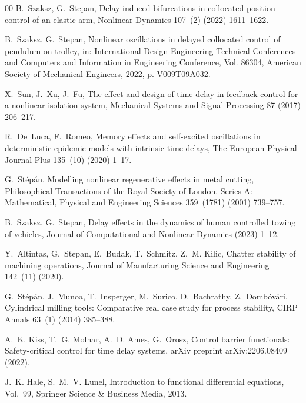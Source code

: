 \documentclass[preprint,12pt]{elsarticle}
\begin{document}
\begin{thebibliography}{00}
		B.~Szaksz, G.~Stepan, Delay-induced bifurcations in collocated position control
		of an elastic arm, Nonlinear Dynamics 107~(2) (2022) 1611--1622.
		
		B.~Szaksz, G.~Stepan, Nonlinear oscillations in delayed collocated control of
		pendulum on trolley, in: International Design Engineering Technical
		Conferences and Computers and Information in Engineering Conference, Vol.
		86304, American Society of Mechanical Engineers, 2022, p. V009T09A032.
		
		X.~Sun, J.~Xu, J.~Fu, The effect and design of time delay in feedback control
		for a nonlinear isolation system, Mechanical Systems and Signal Processing 87
		(2017) 206--217.
		
		R.~De~Luca, F.~Romeo, Memory effects and self-excited oscillations in
		deterministic epidemic models with intrinsic time delays, The European
		Physical Journal Plus 135~(10) (2020) 1--17.
		
		G.~St{\'e}p{\'a}n, Modelling nonlinear regenerative effects in metal cutting,
		Philosophical Transactions of the Royal Society of London. Series A:
		Mathematical, Physical and Engineering Sciences 359~(1781) (2001) 739--757.
		
		B.~Szaksz, G.~Stepan, Delay effects in the dynamics of human controlled towing
		of vehicles, Journal of Computational and Nonlinear Dynamics (2023) 1--12.
		
		Y.~Altintas, G.~Stepan, E.~Budak, T.~Schmitz, Z.~M. Kilic, Chatter stability of
		machining operations, Journal of Manufacturing Science and Engineering
		142~(11) (2020).
		
		G.~St{\'e}p{\'a}n, J.~Munoa, T.~Insperger, M.~Surico, D.~Bachrathy,
		Z.~Domb{\'o}v{\'a}ri, Cylindrical milling tools: Comparative real case study
		for process stability, CIRP Annals 63~(1) (2014) 385--388.
		
		A.~K. Kiss, T.~G. Molnar, A.~D. Ames, G.~Orosz, Control barrier functionals:
		Safety-critical control for time delay systems, arXiv preprint
		arXiv:2206.08409 (2022).
		
		J.~K. Hale, S.~M.~V. Lunel, Introduction to functional differential equations,
		Vol.~99, Springer Science \& Business Media, 2013.
		

\end{thebibliography}
\end{document}
